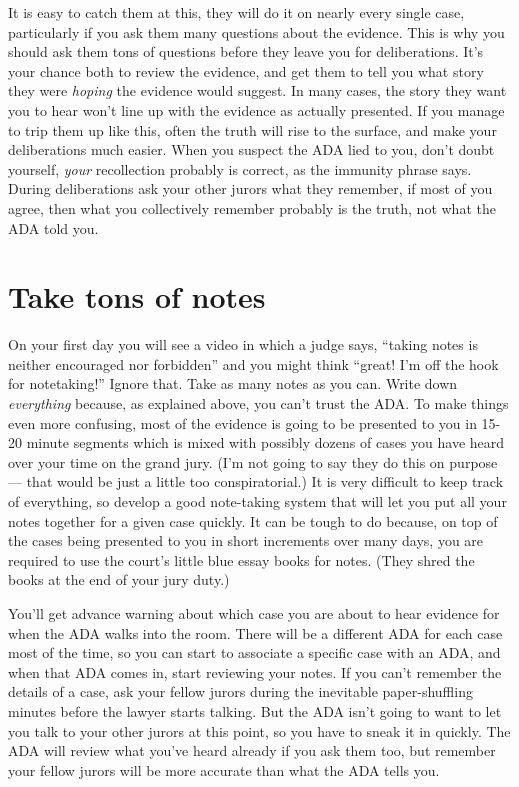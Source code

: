 \documentclass[letterpaper]{article}
\begin{document}
It is easy to catch them at this, they will do it on nearly every single case, particularly if you ask them many questions about the evidence.
This is why you should ask them tons of questions before they leave you for deliberations.
It's your chance both to review the evidence, and get them to tell you what story they were \emph{hoping} the evidence would suggest.
In many cases, the story they want you to hear won't line up with the evidence as actually presented. 
If you manage to trip them up like this, often the truth will rise to the surface, and make your deliberations much easier.
When you suspect the ADA lied to you, don't doubt yourself, \emph{your} recollection probably is correct, as the immunity phrase says.
During deliberations ask your other jurors what they remember, if most of you agree, then what you collectively remember probably is the truth, not what the ADA told you. 

\section*{Take tons of notes}
On your first day you will see a video in which a judge says, ``taking notes is neither encouraged nor forbidden'' and you might think ``great! I'm off the hook for notetaking!''
Ignore that. Take as many notes as you can. 
Write down \emph{everything} because, as explained above, you can't trust the ADA. 
To make things even more confusing, most of the evidence is going to be presented to you in 15-20 minute segments which is mixed with possibly dozens of cases you have heard over your time on the grand jury. 
(I'm not going to say they do this on purpose --- that would be just a little too conspiratorial.)
It is very difficult to keep track of everything, so develop a good note-taking system that will let you put all your notes together for a given case quickly.
It can be tough to do because, on top of the cases being presented to you in short increments over many days, you are required to use the court's little blue essay books for notes.
(They shred the books at the end of your jury duty.)

You'll get advance warning about which case you are about to hear evidence for when the ADA walks into the room.
There will be a different ADA for each case most of the time, so you can start to associate a specific case with an ADA, and when that ADA comes in, start reviewing your notes.
If you can't remember the details of a case, ask your fellow jurors during the inevitable paper-shuffling minutes before the lawyer starts talking.
But the ADA isn't going to want to let you talk to your other jurors at this point, so you have to sneak it in quickly.
The ADA will review what you've heard already if you ask them too, but remember your fellow jurors will be more accurate than what the ADA tells you.
\end{document}
